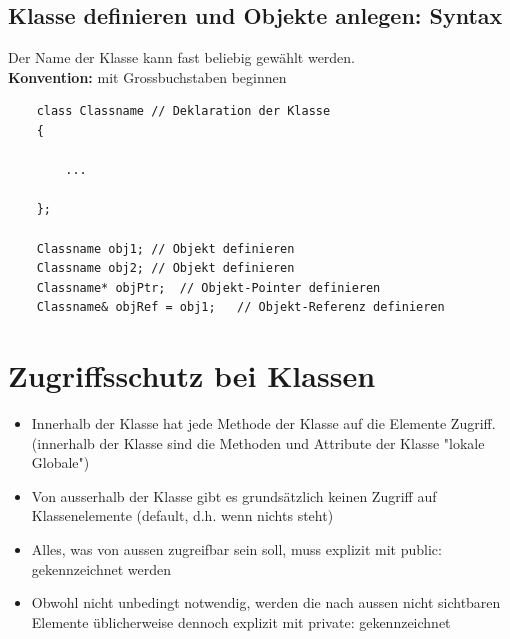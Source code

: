 \subsection{Klasse definieren und Objekte anlegen: Syntax}
\label{sec:Klasse definieren und Objekte anlegen: Syntax}
Der Name der Klasse kann fast beliebig gewählt werden.\\
\textbf{Konvention:} mit Grossbuchstaben beginnen
\noindent
\begin{minipage}{\linewidth}
	\begin{lstlisting}
	class Classname	// Deklaration der Klasse
	{
	
		...
	
	};
	
	Classname obj1;	// Objekt definieren
	Classname obj2;	// Objekt definieren
	Classname* objPtr;	// Objekt-Pointer definieren
	Classname& objRef = obj1;	// Objekt-Referenz definieren
	\end{lstlisting}
\end{minipage}

\section{Zugriffsschutz bei Klassen}
\label{Zugriffsschutz bei Klassen}
\begin{itemize}
	\item Innerhalb der Klasse hat jede Methode der Klasse auf die Elemente Zugriff. (innerhalb der Klasse sind die Methoden und Attribute der Klasse "lokale Globale")
	\item Von ausserhalb der Klasse gibt es grundsätzlich keinen Zugriff auf Klassenelemente (default, d.h. wenn nichts steht)
	\item Alles, was von aussen zugreifbar sein soll, muss explizit mit public: gekennzeichnet werden
	\item Obwohl nicht unbedingt notwendig, werden die nach aussen nicht sichtbaren Elemente üblicherweise dennoch explizit mit private: gekennzeichnet
\end{itemize}

